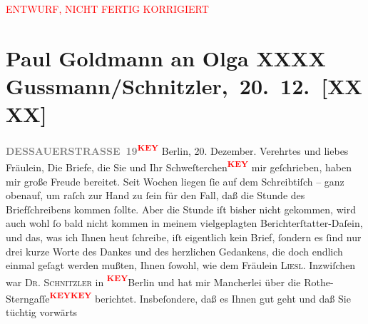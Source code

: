 
\begin{center}
            \textcolor{red}{ENTWURF, NICHT FERTIG KORRIGIERT}
                      \end{center}
            
         
         \renewcommand{\erwaehntePersonen}{Personen: Olga Schnitzler, Elisabeth Steinrück}
         \renewcommand{\erwaehnteOrte}{Orte: Berlin, Wien}
         \renewcommand{\erwaehnteWerke}{}
               \section[ Paul Goldmann an Olga XXXX Gussmann/Schnitzler, 20. 12. {[}XXXX{]}]{ Paul Goldmann an Olga XXXX Gussmann/Schnitzler, 20. 12. {[}XXXX{]}}\nopagebreak{}\rehead{ }\begin{ledgroupsized}[t]{13cm}\normalsize\beginnumbering \toendnotes[C]{\smallbreak\pagebreak[2]} 
\toendnotes[C]{\smallbreak}{\pb}\textcolor{gray}{\textbf{DESSAUERSTRASSE 19}}\textcolor{red}{\textsuperscript{\textbf{KEY}}}\pstart
           Berlin, 20. Dezember.\pend
           \pstart{}Verehrtes und liebes Fräulein,\pend\pstart
           Die Briefe, die Sie und Ihr Schweſterchen\textcolor{red}{\textsuperscript{\textbf{KEY}}} mir
               geſchrieben, haben mir  große Freude
               bereitet. Seit Wochen liegen ſie auf dem Schreibtiſch – ganz obenauf, um raſch zur
               Hand zu ſein für den Fall, daß die Stunde des Briefſchreibens kommen ſollte. Aber die
               Stunde iſt bisher nicht gekommen, wird auch wohl ſo bald nicht kommen in meinem
               vielgeplagten Berichterſtatter-Daſein, und das, was ich Ihnen heut
               ſchreibe, iſt eigentlich kein Brief, ſondern es ſind nur drei kurze Worte des Dankes
               und des herzlichen Gedankens, die doch endlich einmal geſagt werden mußten, Ihnen {\pb} ſowohl, wie dem Fräulein \textsc{Liesl}.\pend
           \pstart
           Inzwiſchen war \textsc{Dr. Schnitzler} in \textcolor{red}{\textsuperscript{\textbf{KEY}}}Berlin und hat mir Mancherlei über die Rothe-Sterngaſſe\textcolor{red}{\textsuperscript{\textbf{KEY}}}\textcolor{red}{\textsuperscript{\textbf{KEY}}} berichtet. Insbeſondere, daß es Ihnen gut geht und daß Sie tüchtig vorwärts

\end{ledgroupsized}
